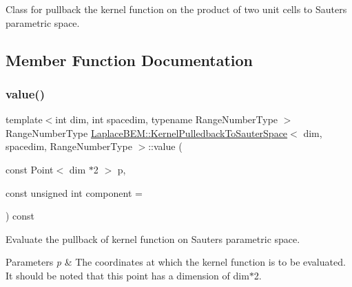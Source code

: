 Class for pullback the kernel function on the product of two unit cells to Sauter\textquotesingle{}s parametric space. 

\subsection{Member Function Documentation}
\mbox{\label{classLaplaceBEM_1_1KernelPulledbackToSauterSpace_a27d5e8b248c5060198b9137162d77c0c}} 
\subsubsection{\texorpdfstring{value()}{value()}\hspace{0.1cm}{\footnotesize\ttfamily [1/2]}}
{\footnotesize\ttfamily template$<$int dim, int spacedim, typename Range\+Number\+Type $>$ \\
Range\+Number\+Type \hyperlink{classLaplaceBEM_1_1KernelPulledbackToSauterSpace}{Laplace\+B\+E\+M\+::\+Kernel\+Pulledback\+To\+Sauter\+Space}$<$ dim, spacedim, Range\+Number\+Type $>$\+::value (\begin{DoxyParamCaption}\item[{const Point$<$ dim $\ast$2 $>$}]{p,  }\item[{const unsigned int}]{component = {} }\end{DoxyParamCaption}) const}

Evaluate the pullback of kernel function on Sauter\textquotesingle{}s parametric space.


\begin{DoxyParams}{Parameters}
{\em p} & The coordinates at which the kernel function is to be evaluated. It should be noted that this point has a dimension of dim$\ast$2. \\
\hline
\end{DoxyParams}
\mbox{\label{classLaplaceBEM_1_1KernelPulledbackToSauterSpace_a3f811601a201e4c68cd1a9392866706b}} 
